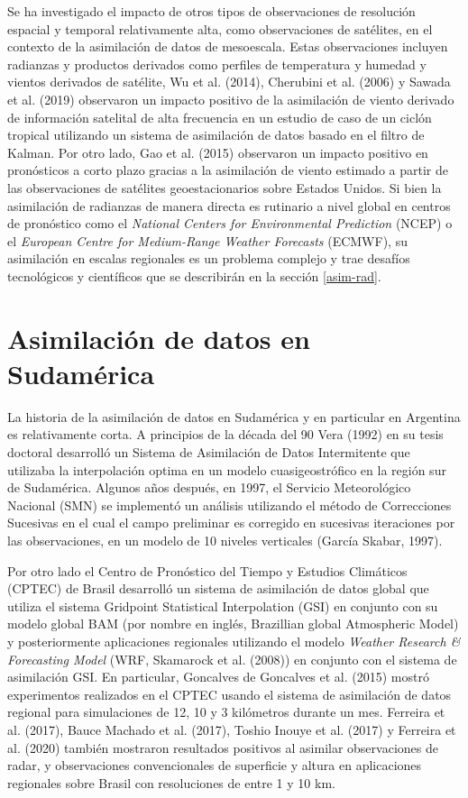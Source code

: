 \documentclass[12pt,oneside,a4paper]{reedthesis}
\begin{document}
Se ha investigado el impacto de otros tipos de observaciones de resolución espacial y temporal relativamente alta, como observaciones de satélites, en el contexto de la asimilación de datos de mesoescala. Estas observaciones incluyen radianzas y productos derivados como perfiles de temperatura y humedad y vientos derivados de satélite, Wu et al. (2014), Cherubini et al. (2006) y Sawada et al. (2019) observaron un impacto positivo de la asimilación de viento derivado de información satelital de alta frecuencia en un estudio de caso de un ciclón tropical utilizando un sistema de asimilación de datos basado en el filtro de Kalman. Por otro lado, Gao et al. (2015) observaron un impacto positivo en pronósticos a corto plazo gracias a la asimilación de viento estimado a partir de las observaciones de satélites geoestacionarios sobre Estados Unidos. Si bien la asimilación de radianzas de manera directa es rutinario a nivel global en centros de pronóstico como el \emph{National Centers for Environmental Prediction} (NCEP) o el \emph{European Centre for Medium-Range Weather Forecasts} (ECMWF), su asimilación en escalas regionales es un problema complejo y trae desafíos tecnológicos y científicos que se describirán en la sección \ref{asim-rad}.

\hypertarget{asimilaciuxf3n-de-datos-en-sudamuxe9rica}{%
\section{Asimilación de datos en Sudamérica}\label{asimilaciuxf3n-de-datos-en-sudamuxe9rica}}

La historia de la asimilación de datos en Sudamérica y en particular en Argentina es relativamente corta. A principios de la década del 90 Vera (1992) en su tesis doctoral desarrolló un Sistema de Asimilación de Datos Intermitente que utilizaba la interpolación optima en un modelo cuasigeostrófico en la región sur de Sudamérica. Algunos años después, en 1997, el Servicio Meteorológico Nacional (SMN) se implementó un
análisis utilizando el método de Correcciones Sucesivas en el cual el campo preliminar
es corregido en sucesivas iteraciones por las observaciones, en un modelo de 10 niveles verticales (García Skabar, 1997).

Por otro lado el Centro de Pronóstico del Tiempo y Estudios Climáticos (CPTEC) de Brasil desarrolló un sistema de asimilación de datos global que utiliza el sistema Gridpoint Statistical Interpolation (GSI) en conjunto con su modelo global BAM (por nombre en inglés, Brazillian global Atmospheric Model) y posteriormente aplicaciones regionales utilizando el modelo \emph{Weather Research \& Forecasting Model} (WRF, Skamarock et al. (2008)) en conjunto con el sistema de asimilación GSI. En particular, Goncalves de Goncalves et al. (2015) mostró experimentos realizados en el CPTEC usando el sistema de asimilación de datos regional para simulaciones de 12, 10 y 3 kilómetros durante un mes. Ferreira et al. (2017), Bauce Machado et al. (2017), Toshio Inouye et al. (2017) y Ferreira et al. (2020) también mostraron resultados positivos al asimilar observaciones de radar, y observaciones convencionales de superficie y altura en aplicaciones regionales sobre Brasil con resoluciones de entre 1 y 10 km.
\end{document}
